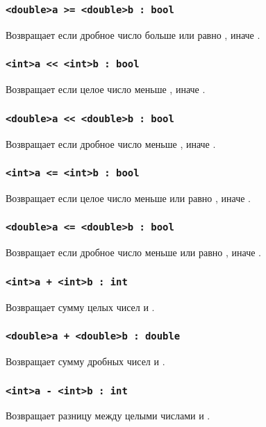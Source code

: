 \documentclass[a4paper, 14pt]{extarticle}
\begin{document}
\subsubsection{\lstinline`<double>a >= <double>b : bool`}
	Возвращает  если дробное число  больше или равно , иначе .

\subsubsection{\lstinline`<int>a << <int>b : bool`}
	Возвращает  если целое число  меньше , иначе .

\subsubsection{\lstinline`<double>a << <double>b : bool`}
	Возвращает  если дробное число  меньше , иначе .

\subsubsection{\lstinline`<int>a <= <int>b : bool`}
	Возвращает  если целое число  меньше или равно , иначе .

\subsubsection{\lstinline`<double>a <= <double>b : bool`}
	Возвращает  если дробное число  меньше или равно , иначе .


\subsubsection{\lstinline`<int>a + <int>b : int`}
	Возвращает сумму целых чисел  и .

\subsubsection{\lstinline`<double>a + <double>b : double`}
	Возвращает сумму дробных чисел  и .

\subsubsection{\lstinline`<int>a - <int>b : int`}
	Возвращает разницу между целыми числами  и .
\end{document}
